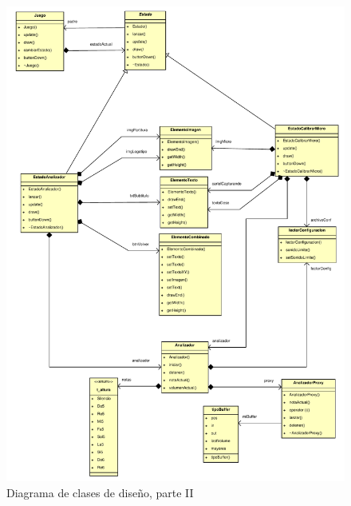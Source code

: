 \begin{figure}[htp!]
  \centering
  \includegraphics[width=\textwidth, clip=true, trim=0cm 0cm 0cm 0cm]{5_diseno/diagrama2}
  \caption{Diagrama de clases de diseño, parte II}
  \label{fig:diagrama_clases_2}
\end{figure}

